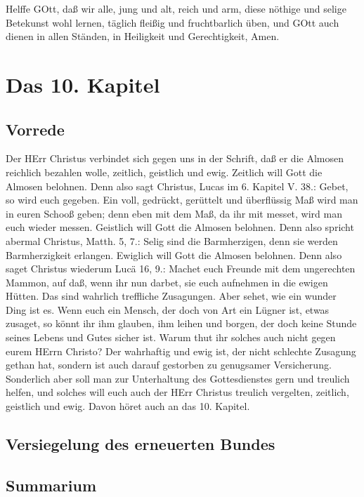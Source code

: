 Helffe GOtt, daß wir alle, jung und alt, reich und arm, diese nöthige und selige Betekunst wohl lernen, täglich fleißig und fruchtbarlich üben, und GOtt auch dienen in allen Ständen, in Heiligkeit und Gerechtigkeit, Amen.

\chapter{Das 10. Kapitel}

\section{Vorrede}

Der HErr Christus verbindet sich gegen uns in der Schrift, daß er die Almosen reichlich bezahlen wolle, zeitlich, geistlich und ewig. Zeitlich will Gott die Almosen belohnen. Denn also sagt Christus, Lucas im 6. Kapitel V. 38.: Gebet, so wird euch gegeben. Ein voll, gedrückt, gerüttelt und überflüssig Maß wird man in euren Schooß geben; denn eben mit dem Maß, da ihr mit messet, wird man euch wieder messen. Geistlich will Gott die Almosen belohnen. Denn also spricht abermal Christus, Matth. 5, 7.: Selig sind die Barmherzigen, denn sie werden Barmherzigkeit erlangen. Ewiglich will Gott die Almosen belohnen. Denn also saget Christus wiederum Lucä 16, 9.: Machet euch Freunde mit dem ungerechten Mammon, auf daß, wenn ihr nun darbet, sie euch aufnehmen in die ewigen Hütten. Das sind wahrlich treffliche Zusagungen. Aber sehet, wie ein wunder Ding ist es. Wenn euch ein Mensch, der doch von Art ein Lügner ist, etwas zusaget, so könnt ihr ihm glauben, ihm leihen und borgen, der doch keine Stunde seines Lebens und Gutes sicher ist. Warum thut ihr solches auch nicht gegen eurem HErrn Christo? Der wahrhaftig und ewig ist, der nicht schlechte Zusagung gethan hat, sondern ist auch darauf gestorben zu genugsamer Versicherung. Sonderlich aber soll man zur Unterhaltung des Gottesdienstes gern und treulich helfen, und solches will euch auch der HErr Christus treulich vergelten, zeitlich, geistlich und ewig. Davon höret auch an das 10. Kapitel.

\section{Versiegelung des erneuerten Bundes}


\section{Summarium}

